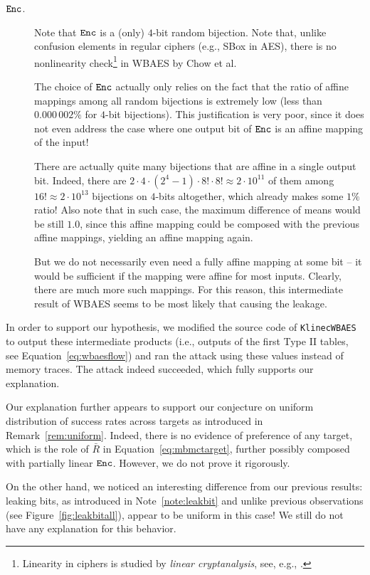 \begin{description}
	\item[$\texttt{Enc}$.] Note that $\texttt{Enc}$ is a (only) $4$-bit random bijection. Note that, unlike confusion elements in regular ciphers (e.g., SBox in AES), there is no nonlinearity check\footnote{Linearity in ciphers is studied by {\em linear cryptanalysis}, see, e.g., \cite{matsui1993linear}.} in WBAES by Chow et al.
	
	The choice of $\texttt{Enc}$ actually only relies on the fact that the ratio of affine mappings among all random bijections is extremely low (less than $0.000\,002\%$ for $4$-bit bijections). This justification is very poor, since it does not even address the case where one output bit of $\texttt{Enc}$ is an affine mapping of the input!
	
	There are actually quite many bijections that are affine in a single output bit. Indeed, there are $2\cdot4\cdot(2^4-1)\cdot8!\cdot8! \approx 2\cdot10^{11}$ of them among $16! \approx 2\cdot10^{13}$ bijections on $4$-bits altogether, which already makes some $1\%$ ratio! Also note that in such case, the maximum difference of means would be still $1.0$, since this affine mapping could be composed with the previous affine mappings, yielding an affine mapping again.
	
	But we do not necessarily even need a fully affine mapping at some bit -- it would be sufficient if the mapping were affine for most inputs. Clearly, there are much more such mappings. For this reason, this intermediate result of WBAES seems to be most likely that causing the leakage.
\end{description}

In order to support our hypothesis, we modified the source code of {\tt KlinecWBAES} to output these intermediate products (i.e., outputs of the first Type II tables, see Equation~\ref{eq:wbaesflow}) and ran the attack using these values instead of memory traces. The attack indeed succeeded, which fully supports our explanation.

\begin{note}
\label{note:leakbituniform}
	Our explanation further appears to support our conjecture on uniform distribution of success rates across targets as introduced in Remark~\ref{rem:uniform}. Indeed, there is no evidence of preference of any target, which is the role of $\bar R$ in Equation~\ref{eq:mbmctarget}, further possibly composed with partially linear $\texttt{Enc}$. However, we do not prove it rigorously.
	
	On the other hand, we noticed an interesting difference from our previous results: leaking bits, as introduced in Note~\ref{note:leakbit} and unlike previous observations (see Figure~\ref{fig:leakbitall}), appear to be uniform in this case! We still do not have any explanation for this behavior.
\end{note}

